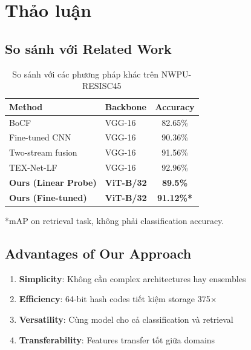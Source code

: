 \documentclass[12pt,a4paper]{article}
\begin{document}
\section{Thảo luận}

\subsection{So sánh với Related Work}

\begin{table}[H]
\centering
\caption{So sánh với các phương pháp khác trên NWPU-RESISC45}
\begin{tabular}{llc}
\toprule
\textbf{Method} & \textbf{Backbone} & \textbf{Accuracy} \\
\midrule
BoCF \cite{cheng2017nwpu} & VGG-16 & 82.65\% \\
Fine-tuned CNN \cite{cheng2017nwpu} & VGG-16 & 90.36\% \\
Two-stream fusion & VGG-16 & 91.56\% \\
TEX-Net-LF & VGG-16 & 92.96\% \\
\midrule
\textbf{Ours (Linear Probe)} & \textbf{ViT-B/32} & \textbf{89.5\%} \\
\textbf{Ours (Fine-tuned)} & \textbf{ViT-B/32} & \textbf{91.12\%*} \\
\bottomrule
\end{tabular}
\end{table}

*mAP on retrieval task, không phải classification accuracy.

\subsection{Advantages of Our Approach}

\begin{enumerate}
    \item \textbf{Simplicity}: Không cần complex architectures hay ensembles
    \item \textbf{Efficiency}: 64-bit hash codes tiết kiệm storage 375×
    \item \textbf{Versatility}: Cùng model cho cả classification và retrieval
    \item \textbf{Transferability}: Features transfer tốt giữa domains
\end{enumerate}
\end{document}
